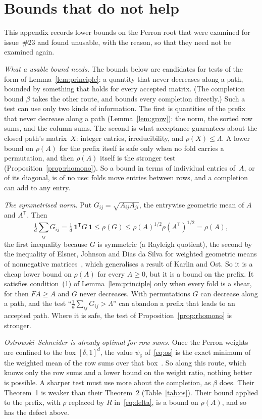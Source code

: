 \documentclass[11pt]{amsart}
\newcommand{\Lam}{\Lambda}
\theoremstyle{plain}
\theoremstyle{definition}
\begin{document}
\appendix

\section{Bounds that do not help}
\label{app:unusable}

This appendix records lower bounds on the Perron root that were examined
for issue~\#23 and found unusable, with the reason, so that they need not
be examined again.

\emph{What a usable bound needs.}  The bounds below are candidates for
tests of the form of Lemma~\ref{lem:principle}: a quantity that never
decreases along a path, bounded by something that holds for every
accepted matrix.  (The completion bound $\beta$ takes the other route, and
bounds every completion directly.)  Such a test can use only two kinds of
information.  The first is quantities of the prefix that never decrease
along a path (Lemma~\ref{lem:grow}): the norm, the sorted row sums, and
the column sums.  The second is what acceptance guarantees about the
closed path's matrix~$X$: integer entries, irreducibility, and
$\rho(X)\le\Lam$.  A lower bound on $\rho(A)$ for the prefix itself is
safe only when no fold carries a permutation, and then $\rho(A)$ itself is
the stronger test (Proposition~\ref{prop:rhomono}).  So a bound in terms
of individual entries of~$A$, or of its diagonal, is of no use: folds move
entries between rows, and a completion can add to any entry.

\emph{The symmetrised norm.}  Put $G_{ij}=\sqrt{A_{ij}A_{ji}}$, the
entrywise geometric mean of $A$ and $A^{\mathsf T}$.  Then
\[
  \tfrac1d\textstyle\sum_{ij}G_{ij}
  =\tfrac1d\,\mathbf 1^{\mathsf T}G\,\mathbf 1\le\rho(G)
  \le\rho(A)^{1/2}\rho(A^{\mathsf T})^{1/2}=\rho(A),
\]
the first inequality because $G$ is symmetric (a Rayleigh quotient), the
second by the inequality of Elsner, Johnson and Dias da Silva for weighted
geometric means of nonnegative matrices~\cite{EJD}, which generalises a
result of Karlin and Ost.  So it is a cheap lower bound on $\rho(A)$ for
every $A\ge0$, but it is a bound on the prefix.  It satisfies condition~(1)
of Lemma~\ref{lem:principle} only when every fold is a shear, for then
$FA\ge A$ and $G$ never decreases.  With permutations $G$ can decrease
along a path, and the test ``$\frac1d\sum_{ij}G_{ij}>\Lam$'' can abandon a
prefix that leads to an accepted path.  Where it is safe, the test of
Proposition~\ref{prop:rhomono} is stronger.

\emph{Ostrowski--Schneider is already optimal for row sums.}  Once the
Perron weights are confined to the box $[\delta,1]^d$, the value
$\psi_\delta$ of~\eqref{eq:os} is the exact minimum of the weighted mean of
the row sums over that box~\cite[Lemma~2]{OstrowskiSchneider}.  So along
this route, which knows only the row sums and a lower bound on the weight
ratio, nothing better is possible.  A sharper test must use more about the
completion, as $\beta$ does.  Their Theorem~1 is weaker than their
Theorem~2 (Table~\ref{tab:os}).  Their bound applied to the prefix, with
$\rho$ replaced by $R$ in~\eqref{eq:delta}, is a bound on $\rho(A)$, and so
has the defect above.
\end{document}
